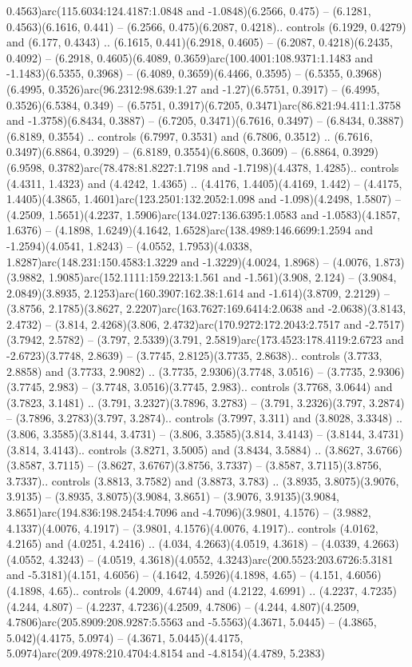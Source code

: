 0.4563)arc(115.6034:124.4187:1.0848 and -1.0848)(6.2566, 0.475) -- (6.1281, 0.4563)(6.1616, 0.441) -- (6.2566, 0.475)(6.2087, 0.4218).. controls (6.1929, 0.4279) and (6.177, 0.4343) .. (6.1615, 0.441)(6.2918, 0.4605) -- (6.2087, 0.4218)(6.2435, 0.4092) -- (6.2918, 0.4605)(6.4089, 0.3659)arc(100.4001:108.9371:1.1483 and -1.1483)(6.5355, 0.3968) -- (6.4089, 0.3659)(6.4466, 0.3595) -- (6.5355, 0.3968)(6.4995, 0.3526)arc(96.2312:98.639:1.27 and -1.27)(6.5751, 0.3917) -- (6.4995, 0.3526)(6.5384, 0.349) -- (6.5751, 0.3917)(6.7205, 0.3471)arc(86.821:94.411:1.3758 and -1.3758)(6.8434, 0.3887) -- (6.7205, 0.3471)(6.7616, 0.3497) -- (6.8434, 0.3887)(6.8189, 0.3554) .. controls (6.7997, 0.3531) and (6.7806, 0.3512) .. (6.7616, 0.3497)(6.8864, 0.3929) -- (6.8189, 0.3554)(6.8608, 0.3609) -- (6.8864, 0.3929)(6.9598, 0.3782)arc(78.478:81.8227:1.7198 and -1.7198)(4.4378, 1.4285).. controls (4.4311, 1.4323) and (4.4242, 1.4365) .. (4.4176, 1.4405)(4.4169, 1.442) -- (4.4175, 1.4405)(4.3865, 1.4601)arc(123.2501:132.2052:1.098 and -1.098)(4.2498, 1.5807) -- (4.2509, 1.5651)(4.2237, 1.5906)arc(134.027:136.6395:1.0583 and -1.0583)(4.1857, 1.6376) -- (4.1898, 1.6249)(4.1642, 1.6528)arc(138.4989:146.6699:1.2594 and -1.2594)(4.0541, 1.8243) -- (4.0552, 1.7953)(4.0338, 1.8287)arc(148.231:150.4583:1.3229 and -1.3229)(4.0024, 1.8968) -- (4.0076, 1.873)(3.9882, 1.9085)arc(152.1111:159.2213:1.561 and -1.561)(3.908, 2.124) -- (3.9084, 2.0849)(3.8935, 2.1253)arc(160.3907:162.38:1.614 and -1.614)(3.8709, 2.2129) -- (3.8756, 2.1785)(3.8627, 2.2207)arc(163.7627:169.6414:2.0638 and -2.0638)(3.8143, 2.4732) -- (3.814, 2.4268)(3.806, 2.4732)arc(170.9272:172.2043:2.7517 and -2.7517)(3.7942, 2.5782) -- (3.797, 2.5339)(3.791, 2.5819)arc(173.4523:178.4119:2.6723 and -2.6723)(3.7748, 2.8639) -- (3.7745, 2.8125)(3.7735, 2.8638).. controls (3.7733, 2.8858) and (3.7733, 2.9082) .. (3.7735, 2.9306)(3.7748, 3.0516) -- (3.7735, 2.9306)(3.7745, 2.983) -- (3.7748, 3.0516)(3.7745, 2.983).. controls (3.7768, 3.0644) and (3.7823, 3.1481) .. (3.791, 3.2327)(3.7896, 3.2783) -- (3.791, 3.2326)(3.797, 3.2874) -- (3.7896, 3.2783)(3.797, 3.2874).. controls (3.7997, 3.311) and (3.8028, 3.3348) .. (3.806, 3.3585)(3.8144, 3.4731) -- (3.806, 3.3585)(3.814, 3.4143) -- (3.8144, 3.4731)(3.814, 3.4143).. controls (3.8271, 3.5005) and (3.8434, 3.5884) .. (3.8627, 3.6766)(3.8587, 3.7115) -- (3.8627, 3.6767)(3.8756, 3.7337) -- (3.8587, 3.7115)(3.8756, 3.7337).. controls (3.8813, 3.7582) and (3.8873, 3.783) .. (3.8935, 3.8075)(3.9076, 3.9135) -- (3.8935, 3.8075)(3.9084, 3.8651) -- (3.9076, 3.9135)(3.9084, 3.8651)arc(194.836:198.2454:4.7096 and -4.7096)(3.9801, 4.1576) -- (3.9882, 4.1337)(4.0076, 4.1917) -- (3.9801, 4.1576)(4.0076, 4.1917).. controls (4.0162, 4.2165) and (4.0251, 4.2416) .. (4.034, 4.2663)(4.0519, 4.3618) -- (4.0339, 4.2663)(4.0552, 4.3243) -- (4.0519, 4.3618)(4.0552, 4.3243)arc(200.5523:203.6726:5.3181 and -5.3181)(4.151, 4.6056) -- (4.1642, 4.5926)(4.1898, 4.65) -- (4.151, 4.6056)(4.1898, 4.65).. controls (4.2009, 4.6744) and (4.2122, 4.6991) .. (4.2237, 4.7235)(4.244, 4.807) -- (4.2237, 4.7236)(4.2509, 4.7806) -- (4.244, 4.807)(4.2509, 4.7806)arc(205.8909:208.9287:5.5563 and -5.5563)(4.3671, 5.0445) -- (4.3865, 5.042)(4.4175, 5.0974) -- (4.3671, 5.0445)(4.4175, 5.0974)arc(209.4978:210.4704:4.8154 and -4.8154)(4.4789, 5.2383) 